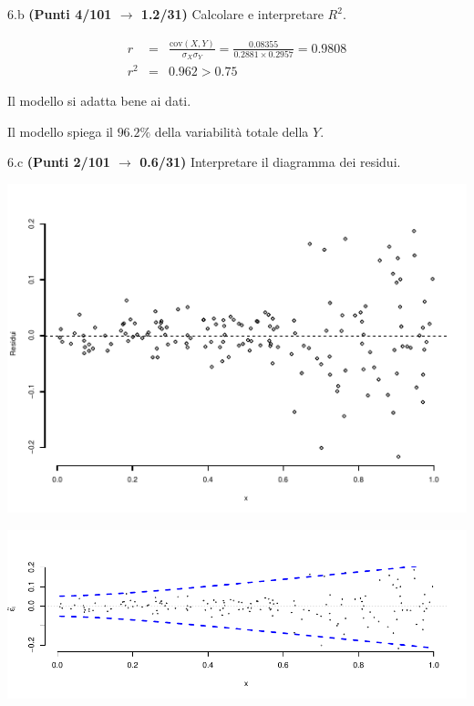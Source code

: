 \documentclass[
  11pt,
]{book}
\theoremstyle{mytheoremstyle}
\theoremstyle{mydefstyle}
\newenvironment{sol}
  {
  \begin{tcolorbox}[enhanced,breakable,arc=0.1mm,boxrule=1pt,colback=white,colframe=iblue,
  title=\bf \fontfamily{lmss}\selectfont \hspace{.5 cm} Soluzione,drop fuzzy shadow]

}{
\end{tcolorbox}
  }
\begin{document}
6.b \textbf{(Punti 4/101 \(\rightarrow\) 1.2/31)} Calcolare e interpretare \(R^2\).

\begin{sol}
\begin{eqnarray*}
r&=&\frac{\text{cov}(X,Y)}{\sigma_X\sigma_Y}=\frac{ 0.08355 }{ 0.2881 \times 0.2957 }= 0.9808 \\ 
r^2&=& 0.962 > 0.75
\end{eqnarray*}

Il modello si adatta bene ai dati.

Il modello spiega il \(96.2\%\) della variabilità totale della \(Y\).

\end{sol}

6.c \textbf{(Punti 2/101 \(\rightarrow\) 0.6/31)} Interpretare il diagramma dei residui.

\begin{center}\includegraphics{Esami_passati_con_soluzioni_files/figure-latex/2023-14,-1} \end{center}

\begin{sol}

\begin{center}\includegraphics{Esami_passati_con_soluzioni_files/figure-latex/2023-15,-1} \end{center}

\end{sol}
\end{document}
